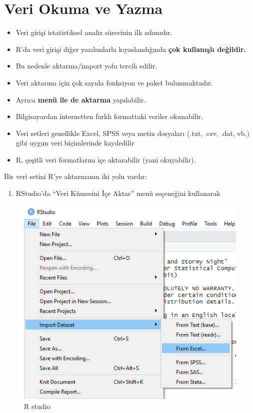 \documentclass[
  oneside]{book}
\providecommand{\tightlist}{%
  \setlength{\itemsep}{0pt}\setlength{\parskip}{0pt}}
\begin{document}
\hypertarget{veri-okuma-ve-yazma}{%
\chapter{Veri Okuma ve Yazma}\label{veri-okuma-ve-yazma}}

\begin{itemize}
\item
  Veri girişi istatistiksel analiz sürecinin ilk adımıdır.
\item
  R'da veri girişi diğer yazılımlarla kıyaslandığında \textbf{çok kullanışlı değildir.}
\item
  Bu nedenle aktarma/import yolu tercih edilir.
\item
  Veri aktarımı için çok sayıda fonksiyon ve paket bulunmaktadır.
\item
  Ayrıca \textbf{menü ile de aktarma} yapılabilir.
\item
  Bilgisayardan internetten farklı formattaki veriler okunabilir.
\item
  Veri setleri genellikle Excel, SPSS veya metin dosyaları (.txt, .csv, .dat, vb.) gibi uygun veri biçimlerinde kaydedilir
\item
  R, çeşitli veri formatlarını içe aktarabilir (yani okuyabilir).
\end{itemize}

Bir veri setini R'ye aktarmanın iki yolu vardır:

\begin{enumerate}
\def\labelenumi{\arabic{enumi}.}
\tightlist
\item
  RStudio'da ``Veri Kümesini İçe Aktar'' menü seçeneğini kullanarak
\end{enumerate}

\begin{figure}
\centering
\includegraphics{images/importmenu.png}
\caption{R studio}
\end{figure}
\end{document}
